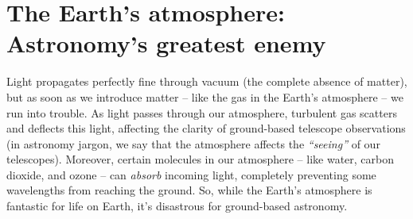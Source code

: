 \documentclass[11pt]{article}
\begin{document}
\bigskip

\section{The Earth's atmosphere: Astronomy's greatest enemy}

Light propagates perfectly fine through vacuum (the complete absence of matter), but as soon as we introduce matter -- like the gas in the Earth's atmosphere -- we run into trouble. As light passes through our atmosphere, turbulent gas scatters and deflects this light, affecting the clarity of ground-based telescope observations (in astronomy jargon, we say that the atmosphere affects the \emph{``seeing''} of our telescopes). Moreover, certain molecules in our atmosphere -- like water, carbon dioxide, and ozone -- can \emph{absorb} incoming light, completely preventing some wavelengths from reaching the ground. So, while the Earth's atmosphere is fantastic for life on Earth, it's disastrous for ground-based astronomy.

\bigskip
\end{document}
